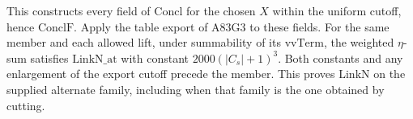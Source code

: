 This constructs every field of $\mathrm{Concl}$ for the chosen
$X$ within the uniform cutoff, hence $\mathrm{ConclF}$.
Apply the table export of A83G3 to these fields. For the same
member and each allowed lift, under summability of its
$\mathrm{vvTerm}$, the weighted $\eta$-sum satisfies
$\mathrm{LinkN\_at}$ with constant $2000(|C_s|+1)^3$.
Both constants and any enlargement of the export cutoff precede
the member. This proves $\mathrm{LinkN}$ on the supplied alternate
family, including when that family is the one obtained by cutting.

